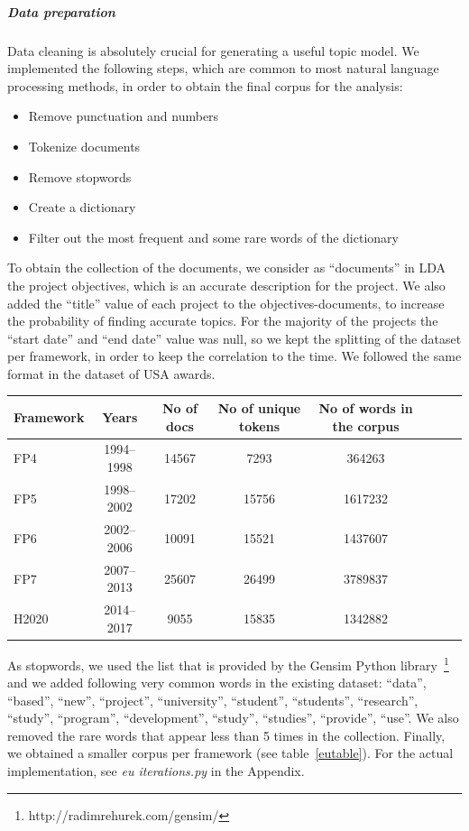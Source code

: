 \documentclass[12pt]{report}
\begin{document}
\subparagraph{Data preparation}

Data cleaning is absolutely crucial for generating a useful topic model. 
We implemented the following steps, which are common to most natural 
language processing methods, in order to obtain the final corpus for the 
analysis:

\begin{itemize}
\item Remove punctuation and numbers
\item Tokenize documents
\item Remove stopwords
\item Create a dictionary
\item Filter out the most frequent and some rare words of the dictionary
\end{itemize}

To obtain the collection of the documents, we consider as ``documents''
in LDA the project objectives, which is an accurate description for
the project. We also added the ``title'' value of each project to the
objectives-documents, to increase the probability of finding accurate
topics. For the majority of the projects the ``start date'' and ``end
date'' value was null, so we kept the splitting of the dataset per
framework, in order to keep the correlation to the time. We followed
the same format in the dataset of USA awards.

\begin{center}
\begin{tabular}{l*{6}{c}r}
Framework & Years & No of docs & No of unique tokens & No of words in the corpus \\
\hline
FP4 & 1994--1998 & 14567 & 7293 & 364263 \\
FP5 & 1998--2002 & 17202 & 15756 & 1617232 \\
FP6 & 2002--2006 & 10091 & 15521 & 1437607 \\
FP7 & 2007--2013 & 25607 & 26499 & 3789837 \\
H2020 & 2014--2017 & 9055 & 15835 & 1342882 \\
\end{tabular}
\label{eutable}
\end{center}

As stopwords, we used the list that is provided by the Gensim Python
library~\footnote{http://radimrehurek.com/gensim/} and we added following very
common words in the existing dataset: ``data'', ``based'', ``new'', ``project'',
``university'', ``student'', ``students'', ``research'', ``study'', ``program'',
``development'', ``study'', ``studies'', ``provide'', ``use''. We also removed 
the rare words that appear less than 5 times in the collection. 
Finally, we obtained a smaller corpus per framework (see table~\ref{eutable}). 
For the actual implementation, see \emph{eu iterations.py} in the Appendix.
\end{document}
